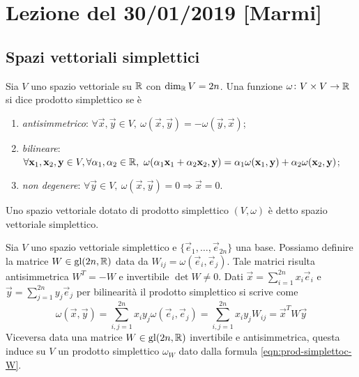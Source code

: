 \section{Lezione del 30/01/2019 [Marmi]}

\subsection{Spazi vettoriali simplettici}

\begin{definition}
    Sia $ V $ uno spazio vettoriale su $ \mathbb{R} $ con $ \dim_{\mathbb{R}} V = 2n $. Una funzione $ \omega \colon V \times V \to \mathbb{R} $ si dice prodotto simplettico se è
    \begin{enumerate}[label=(\roman*)]
        \item \emph{antisimmetrico}: $ \forall \vec{x}, \vec{y} \in V, \ \omega(\vec{x}, \vec{y}) = - \omega(\vec{y}, \vec{x}) $;
        \item \emph{bilineare}: $ \forall \vec{x}_1, \vec{x}_2, \vec{y} \in V, \forall \alpha_1, \alpha_2 \in \R, \ \omega(\alpha_1 \vec{x}_1 + \alpha_2 \vec{x}_2, \vec{y}) = \alpha_1 \omega(\vec{x}_1, \vec{y}) + \alpha_2 \omega(\vec{x}_2, \vec{y}) $;
        \item \emph{non degenere}: $ \forall \vec{y} \in V, \ \omega(\vec{x}, \vec{y}) = 0 \Rightarrow \vec{x} = 0 $.
    \end{enumerate}
    Uno spazio vettoriale dotato di prodotto simplettico $ (V, \omega) $ è detto spazio vettoriale simplettico.
\end{definition}

Sia $ V $ uno spazio vettoriale simplettico e $ \{\vec{e}_1, \ldots, \vec{e}_{2n}\} $ una base. Possiamo definire la matrice $ W \in \mathrm{gl}(2n, \mathbb{R}) $ data da $ W_{ij} = \omega(\vec{e}_i, \vec{e}_j) $. Tale matrici risulta antisimmetrica $ W^{T} = -W $ e invertibile $ \det{W} \neq 0 $. Dati $ \vec{x} = \sum_{i=1}^{2n} x_i \vec{e}_i $ e $ \vec{y} = \sum_{j=1}^{2n} y_j \vec{e}_j $ per bilinearità il prodotto simplettico si scrive come
\begin{equation} \label{eqn:prod-simplettoc-W}
    \omega(\vec{x}, \vec{y}) = \sum_{i, j=1}^{2n} x_i y_j \omega(\vec{e}_i, \vec{e}_j) = \sum_{i, j=1}^{2n} x_i y_j W_{ij} = \vec{x}^T W \vec{y}
\end{equation}
Viceversa data una matrice $ W \in \mathrm{gl}(2n, \mathbb{R}) $ invertibile e antisimmetrica, questa induce su $ V $ un prodotto simplettico $ \omega_W $ dato dalla formula \eqref{eqn:prod-simplettoc-W}. \\

